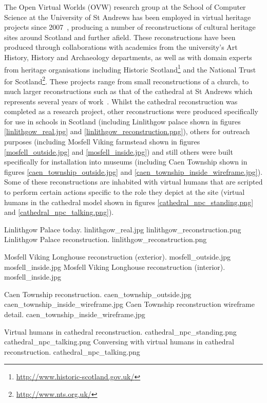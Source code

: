 The Open Virtual Worlds (OVW) research group at the School of Computer Science at the University of St Andrews has been employed in virtual heritage projects since 2007~\cite{Getchell2007}, producing a number of reconstructions of cultural heritage sites around Scotland and further afield. These reconstructions have been produced through collaborations with academics from the university's Art History, History and Archaeology departments, as well as with domain experts from heritage organisations including Historic Scotland\footnote{\url{http://www.historic-scotland.gov.uk/}} and the National Trust for Scotland\footnote{\url{http://www.nts.org.uk/}}. These projects range from small reconstructions of a church, to much larger reconstructions such as that of the cathedral at St Andrews which represents several years of work~\cite{Kennedy2013}. Whilst the cathedral reconstruction was completed as a research project, other reconstructions were produced specifically for use in schools in Scotland (including Linlithgow palace shown in figures \ref{linlithgow_real.jpg} and \ref{linlithgow_reconstruction.png}), others for outreach purposes (including Mosfell Viking farmstead shown in figures \ref{mosfell_outside.jpg} and \ref{mosfell_inside.jpg}) and still others were built specifically for installation into museums (including Caen Township shown in figures  \ref{caen_township_outside.jpg} and \ref{caen_township_inside_wireframe.jpg}). Some of these reconstructions are inhabited with virtual humans that are scripted to perform certain actions specific to the role they depict at the site (virtual humans in the cathedral model shown in figures \ref{cathedral_npc_standing.png} and \ref{cathedral_npc_talking.png}).

 {Linlithgow Palace today.} {linlithgow_real.jpg}
       {linlithgow_reconstruction.png} {Linlithgow Palace reconstruction.} {linlithgow_reconstruction.png}

 {Mosfell Viking Longhouse reconstruction (exterior).} {mosfell_outside.jpg}
	   {mosfell_inside.jpg} {Mosfell Viking Longhouse reconstruction (interior).} {mosfell_inside.jpg}

 {Caen Township reconstruction.} {caen_township_outside.jpg}
       {caen_township_inside_wireframe.jpg} {Caen Township reconstruction wireframe detail.} {caen_township_inside_wireframe.jpg}

 {Virtual humans in cathedral reconstruction.} {cathedral_npc_standing.png}
       {cathedral_npc_talking.png} {Conversing with virtual humans in cathedral reconstruction.} {cathedral_npc_talking.png}

